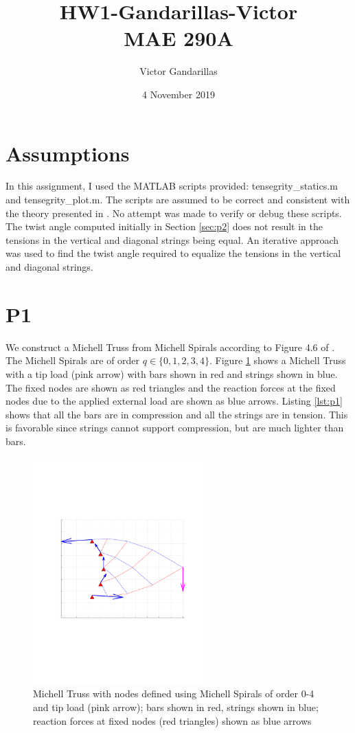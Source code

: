 \documentclass{article}
\title{HW1-Gandarillas-Victor\\
MAE 290A}
\author{Victor Gandarillas}
\date{4 November 2019}
\begin{document}
\maketitle

\section{Assumptions}

In this assignment, I used the MATLAB scripts provided: {\ttfamily tensegrity\_statics.m} and {\ttfamily tensegrity\_plot.m}.
The scripts are assumed to be correct and consistent with the theory presented in \cite{skelton}.
No attempt was made to verify or debug these scripts.
The twist angle computed initially in Section \ref{sec:p2} does not result in the tensions in the vertical and diagonal strings being equal.
An iterative approach was used to find the twist angle required to equalize the tensions in the vertical and diagonal strings.

\section{P1}\label{sec:p1}

We construct a Michell Truss from Michell Spirals according to Figure 4.6 of \cite{skelton}.
The Michell Spirals are of order $q\in\{0,1,2,3,4\}$.
Figure \ref{fig:mt} shows a Michell Truss with a tip load (pink arrow) with bars shown in red and strings shown in blue.
The fixed nodes are shown as red triangles and the reaction forces at the fixed nodes due to the applied external load are shown as blue arrows.
Listing \ref{lst:p1} shows that all the bars are in compression and all the strings are in tension.
This is favorable since strings cannot support compression, but are much lighter than bars.

\begin{figure}[H]
  \centering
  \includegraphics[clip, trim=3.5cm 7.5cm 2.5cm 7.5cm, width=0.6\textwidth]{images/michell_tip_load.pdf}
  \caption{Michell Truss with nodes defined using Michell Spirals of order 0-4 and tip load (pink arrow); bars shown in red, strings shown in blue; reaction forces at fixed nodes (red triangles) shown as blue arrows}
  \label{fig:mt}
\end{figure}
\end{document}

